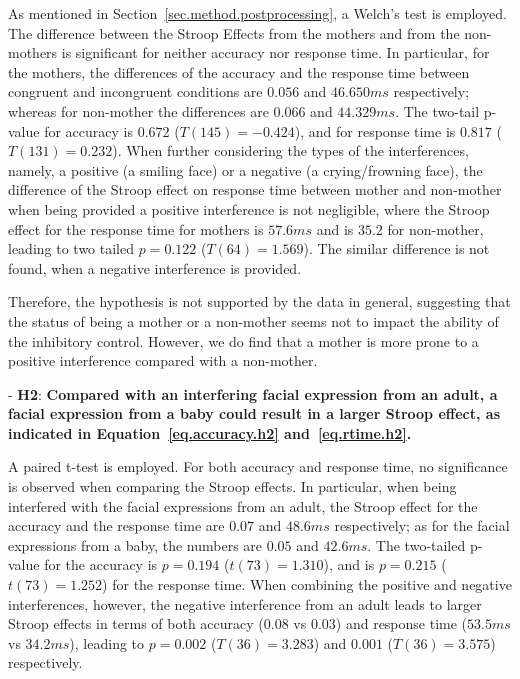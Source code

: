 As mentioned in Section~\ref{sec.method.postprocessing},
a Welch's test is employed. 
The difference between the Stroop Effects from the mothers and from the non-mothers is significant for neither accuracy nor response time.  
In particular, for the mothers,
the differences of the accuracy and the response time 
between congruent and incongruent conditions 
are $0.056$ and $46.650ms$ respectively;
whereas for non-mother the differences are
$0.066$ and $44.329ms$.
The two-tail p-value for accuracy is
$0.672$ ($T(145)=-0.424$), and for response time is
$0.817$ ($T(131)=0.232$).
When further considering the types of the interferences, namely,
a positive (a smiling face) or a negative (a crying/frowning face),
the difference of the Stroop effect on response time between mother and non-mother when being provided a positive interference is not negligible, where the Stroop effect for the response time for mothers is 
$57.6ms$ and is $35.2$ for non-mother, leading to two tailed $p = 0.122$ ($T(64)= 1.569$). The similar difference is not found, when a negative interference is provided.

Therefore, the hypothesis is not supported by the data in general,
suggesting that 
the status of being a mother or a non-mother
seems not to impact the ability of the inhibitory control.
However, we do find that a mother is more prone to a positive interference compared with a non-mother.


\noindent - \textbf{H2}:
\textbf{
Compared with an interfering facial expression from an adult,
a facial expression from a baby could result in
a larger Stroop effect, as indicated in Equation~\ref{eq.accuracy.h2} and~\ref{eq.rtime.h2}.}

A paired t-test is employed.
For both accuracy and response time,
no significance is observed when comparing the Stroop effects.
In particular,
when being interfered with the facial expressions from an adult,
the Stroop effect for the accuracy and the response time  
are $0.07$ and $48.6ms$ respectively; as for the facial expressions from a baby,
the numbers are $0.05$ and $42.6ms$.
The two-tailed p-value for the accuracy is 
$p=0.194$ ($t(73)= 1.310$), and 
is $p = 0.215$ ($t(73)= 1.252$) for the response time.
When combining the positive and negative interferences, however,
the negative interference from an adult leads to larger Stroop effects
in terms of both accuracy ($0.08$ vs $0.03$) and 
response time ($53.5ms$ vs $34.2ms$),
leading to $p=0.002$ ($T(36)= 3.283$) and $0.001$ 
($T(36)=3.575$) respectively.

